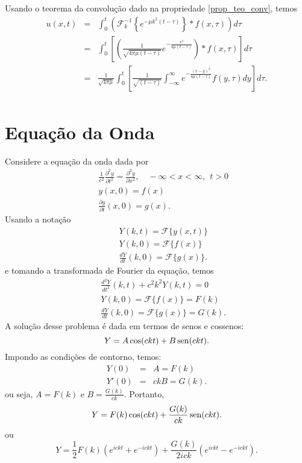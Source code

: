 Usando o teorema da convolução dado na propriedade \ref{prop_teo_conv}, temos
\begin{eqnarray*}
u(x,t)&=&\int_0^t \left(\mathcal{F}_k^{-1}\left\{
e^{-\mu k^2 (t-\tau)}\right\}\ast f(x,\tau)\right)d\tau\\
&=&\int_0^t \left[\left(\frac{1}{\sqrt{4\pi\mu (t-\tau)}} e^{-\frac{x^2}{4\mu (t-\tau)}}\right) \ast f(x,\tau)\right]d\tau\\
&=&\frac{1}{\sqrt{4\pi\mu}}\int_0^t \left[\frac{1}{\sqrt{ (t-\tau)}} \int_{-\infty}^\infty e^{-\frac{(x-y)^2}{4\mu (t-\tau)}}f(y,\tau)dy\right]d\tau.\\
\end{eqnarray*}

\section{Equação da Onda}
Considere a equação da onda dada por
\begin{eqnarray*}
&&\frac{1}{c^2}\frac{\partial^2 y}{\partial t^2}=\frac{\partial^2
y}{\partial x^2},\quad -\infty<x<\infty,\ \ t>0\\
&&y(x,0)=f(x)\\
&&\frac{\partial y}{\partial t}(x,0)=g(x).
\end{eqnarray*}
Usando a notação
\begin{eqnarray*}
&&Y(k,t)=\mathcal{F} \{y(x,t)\}\\
&&Y(k,0)=\mathcal{F}\{f(x)\}\\
&&\frac{d Y}{d t}(k,0)=\mathcal{F}\{g(x)\}.
\end{eqnarray*}
e tomando a transformada de Fourier da equação, temos
\begin{eqnarray*}
&&\frac{d^2 Y}{d
t^2}(k,t)+c^2k^2Y(k,t)=0\\
&&Y(k,0)=\mathcal{F}\{f(x)\}=F(k)\\
&&\frac{d Y}{d t}(k,0)=\mathcal{F}\{g(x)\}=G(k).
\end{eqnarray*}
A solução desse problema é dada em termos de senos e cossenos:
$$
Y=A\cos(ckt)+B\operatorname{sen}(ckt).
$$
Impondo as condições de contorno, temos:
\begin{eqnarray*}
Y(0)&=&A=F(k)\\
Y'(0)&=&ckB=G(k).
\end{eqnarray*}
ou seja, $A=F(k)$ e $B=\frac{G(k)}{ck}$. Portanto,
\begin{equation*}
Y=F(k)\cos(ckt)+\frac{G(k)}{ck}\operatorname{sen}(ckt).
\end{equation*}
ou
\begin{equation*}
Y=\frac{1}{2}F(k)(e^{ickt}+e^{-ickt})+\frac{G(k)}{2ick}(e^{ickt}-e^{-ickt}).
\end{equation*}

